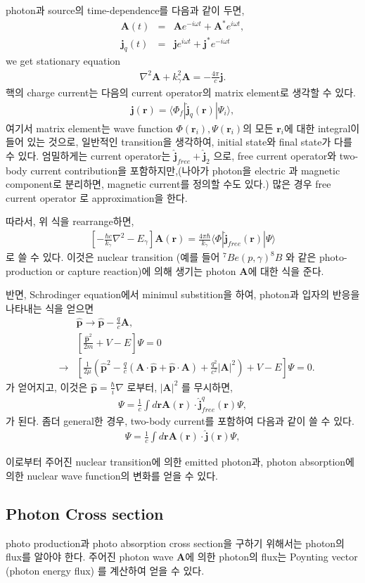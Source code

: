 \documentclass[11pt]{book}
\def\bm{\boldsymbol}
\def\vr{{\bm r}}
\def\la{\langle}
\def\ra{\rangle}
\newcommand{\bea}{\begin{eqnarray}}
\newcommand{\eea}{\end{eqnarray}}
\newcommand{\no}{\nonumber \\}
\begin{document}
photon과 source의 time-dependence를 다음과 같이 두면,
\bea 
{\bm A}(t)&=&{\bm A}e^{-i\omega t}+{\bm A}^* e^{i\omega t},\no 
{\bm j}_q(t)&=&{\bm j}e^{i\omega t}+{\bm j}^* e^{-i\omega t}
\eea 
we get stationary equation
\bea 
\nabla^2{\bm A}+k_\gamma^2{\bm A}= -\frac{4\pi}{c}{\bm j}.
\eea 
핵의 charge current는 다음의 current operator의 matrix element로 생각할 수 있다.
\bea 
{\bm j}(\vr)=\la \Phi_f|\hat{\bm j}_q(\vr)|\Psi_i\ra, 
\eea 
여기서 matrix element는 wave function $\Phi(\vr_i),\Psi(\vr_i)$의 모든 $\vr_i$에 대한 integral이 
들어 있는 것으로, 일반적인 transition을 생각하여, initial state와 final state가 다를 수 있다. 
엄밀하게는 current operator는 $\hat{\bm j}_{free}+\hat{\bm j}_{2}$ 으로, free current operator와 
two-body current contribution을 포함하지만,(나아가 photon을 electric 과 magnetic component로 분리하면,
magnetic current를 정의할 수도 있다.) 많은 경우 free current operator 로 approximation을 한다. 

따라서, 위 식을 rearrange하면,
\bea 
\left[-\frac{\hbar c}{k_\gamma}\nabla^2-E_\gamma \right] {\bm A}(\vr)
 = \frac{4\pi\hbar}{k_\gamma}\la \Phi|\hat{\bm j}_{free}(\vr)|\Psi\ra 
\eea  
로 쓸 수 있다. 이것은 nuclear transition (예를 들어 $^7Be(p,\gamma)^8B$ 와 같은 
photo-production or capture reaction)에 의해 생기는 photon ${\bm A}$에 대한 식을 준다. 

반면, Schrodinger equation에서 minimul substition을 하여, photon과 입자의 반응을 나타내는 식을 얻으면
\bea 
& &\hat{\bm p}\to \hat{\bm p}-\frac{q}{c}{\bm A},\no 
& &[\frac{\hat{\bm p}^2}{2m}+V-E]\Psi=0 \no 
&\to&\left[\frac{1}{2\mu}\left(\hat{\bm p}^2 -\frac{q}{c}({\bm A}\cdot\hat{\bm p}+ \hat{\bm p}\cdot {\bm A})+\frac{q^2}{c^2}|{\bm A}|^2\right)+V-E\right]\Psi=0. 
\eea 
가 얻어지고, 이것은 $\hat{\bm p}=\frac{\hbar}{i}\nabla$ 로부터, $|{\bm A}|^2$ 를 무시하면,
\bea 
[\hat{T}+V-E]\Psi=\frac{1}{c}\int d\vr {\bm A}(\vr)\cdot\hat{\bm j}^q_{free}(\vr)\Psi, 
\eea 
가 된다. 좀더 general한 경우, two-body current를 포함하여 다음과 같이 쓸 수 있다.
\bea 
[\hat{T}+V-E]\Psi=\frac{1}{c}\int d\vr {\bm A}(\vr)\cdot\hat{\bm j}(\vr)\Psi, 
\eea 

이로부터 주어진 nuclear transition에 의한 emitted photon과, photon absorption에 의한
nuclear wave function의 변화를 얻을 수 있다.

\subsection{Photon Cross section}
photo production과 photo absorption cross section을 구하기 위해서는 
photon의 flux를 알아야 한다. 
주어진 photon wave ${\bm A}$에 의한 photon의 flux는 Poynting vector 
(photon energy flux)
를 계산하여 얻을 수 있다. 
\end{document}
